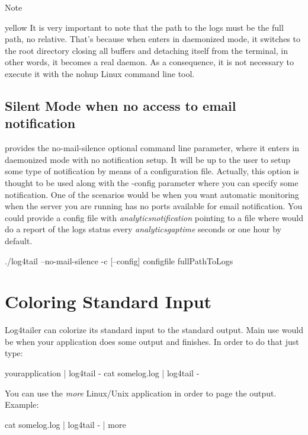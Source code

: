 \begin {bclogo}[logo =\bcinfo, barre = none,noborder = true]{Note}
\begin {gbar}{yellow}
It is very important to note that the
path to the logs must be the full path, no relative. That's because when
\logftailer{} enters in daemonized mode, it switches to the root directory
closing all buffers and detaching itself from the terminal, in other words, it
becomes a real daemon. As a consequence, it is not necessary to execute it with
the nohup Linux command line tool.
\end{gbar}
\end{bclogo}

\subsection{Silent Mode when no access to email notification}
\logftailer{} provides the no-mail-silence optional command line parameter,
where it enters in daemonized mode with no notification setup. It will be up to
the user to setup some type of notification by means of a configuration file.
Actually, this option is thought to be used along with the -config parameter
where you can specify some notification. One of the scenarios would be when you
want automatic monitoring when the server you are running \logftailer{} has no
ports available for email notification. You could provide a config file with
\emph{analyticsnotification} pointing to a file where \logftailer{} would do a
report of the logs status every \emph{analyticsgaptime} seconds or one hour by
default.

\begin{cmd}
 ./log4tail --no-mail-silence -c [--config] configfile fullPathToLogs
\end{cmd}


\section{Coloring Standard Input}
Log4tailer can colorize its standard input to the standard output. Main use
would be when your application does some output and finishes. In order to do
that just type:
\begin{cmd}
 yourapplication | log4tail -
 cat somelog.log | log4tail -
\end{cmd}
You can use the \emph{more} Linux/Unix application in order to page the output.
Example:
\begin{cmd}
 cat somelog.log | log4tail - | more
\end{cmd}

